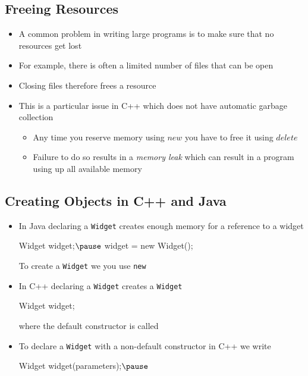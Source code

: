 
\begin{slide}
\section[-2]{Freeing Resources}
\begin{PauseHighLight}
  \begin{itemize}
  \item A common problem in writing large programs is to make sure that
    no resources get lost\pause
  \item For example, there is often a limited number of files that can
    be open\pause
  \item Closing files therefore frees a resource\pause
  \item This is a particular issue in C++ which does not have automatic
    garbage collection\pause
    \begin{itemize}
    \item Any time you reserve memory using \jl$new$ you have to
      free it using \jl$delete$\pause
    \item Failure to do so results in a \textit{memory leak} which can
      result in a program using up all available memory\pause
    \end{itemize}
  \end{itemize}
\end{PauseHighLight}
\end{slide}



\begin{slide}
\section[-2]{Creating Objects in C++ and Java}

\begin{PauseHighLight}
  \begin{itemize}
  \item In Java declaring a \texttt{Widget} creates enough memory for a
    reference to a widget
    \begin{java}
      Widget widget;$\pause$
      widget = new Widget();
    \end{java}
    To create a \texttt{Widget} we you use \texttt{new}\pause
  \item In C++ declaring a \texttt{Widget} creates a \texttt{Widget}
    \begin{java}
      Widget widget;
    \end{java}
    where the default constructor is called\pause
  \item To declare a \texttt{Widget} with a non-default constructor in
    C++ we write
    \begin{java}
      Widget widget(parameters);$\pause$
    \end{java}
  \end{itemize}
\end{PauseHighLight}

\end{slide}

